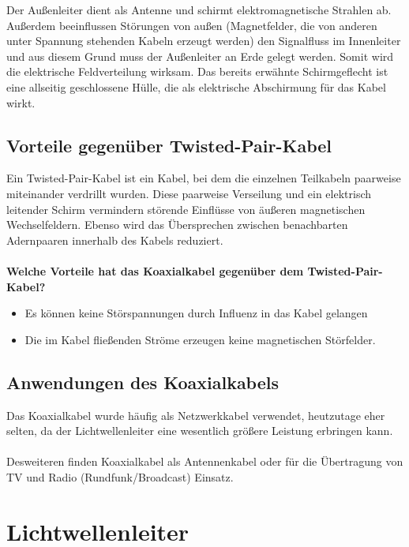 \documentclass[11pt, a4paper]{article}
\begin{document}
\newpage
Der Außenleiter dient als Antenne und schirmt elektromagnetische Strahlen ab. Außerdem
beeinflussen Störungen von außen (Magnetfelder, die von anderen unter Spannung stehenden Kabeln erzeugt werden) den Signalfluss im Innenleiter und aus diesem Grund muss der
Außenleiter an Erde gelegt werden. Somit wird die elektrische Feldverteilung wirksam. Das bereits erwähnte Schirmgeflecht ist eine allseitig geschlossene Hülle, die als elektrische Abschirmung  für das Kabel wirkt.

\subsection{Vorteile gegenüber Twisted-Pair-Kabel}
Ein Twisted-Pair-Kabel ist ein Kabel, bei dem die einzelnen Teilkabeln paarweise miteinander verdrillt wurden. Diese paarweise Verseilung und ein elektrisch leitender Schirm vermindern störende Einflüsse von äußeren magnetischen Wechselfeldern. Ebenso wird das Übersprechen zwischen benachbarten
Adernpaaren innerhalb des Kabels reduziert.\\ \\
\textbf{Welche Vorteile hat das Koaxialkabel gegenüber dem Twisted-Pair-Kabel?}
\begin{itemize}
\item Es können keine Störspannungen durch Influenz in das Kabel gelangen
\item Die im Kabel fließenden Ströme erzeugen keine magnetischen Störfelder.
\end{itemize}

\subsection{Anwendungen des Koaxialkabels}
Das Koaxialkabel wurde häufig als Netzwerkkabel verwendet, heutzutage eher selten, da der Lichtwellenleiter eine wesentlich größere Leistung erbringen kann. \\ \\
Desweiteren finden Koaxialkabel als Antennenkabel oder für die Übertragung von TV und Radio (Rundfunk/Broadcast) Einsatz.

\section{Lichtwellenleiter \cite{lwl} \cite{lwl-wiki}}
\end{document}
